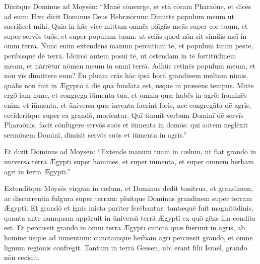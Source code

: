 Dīxitque Dominus ad Moysēn: ``Manē
cōnsurge, et stā cōram Pharaōne, et dīcēs ad eum:
Hæc dīcit Dominus Deus Hebræōrum: Dīmitte populum meum ut sacrificet
mihi.  Quia in hāc vice mittam omnēs 
plāgās meās super
cor tuum, et super servōs tuōs, et super populum tuum: ut sciās quod nōn
sit similis meī in omnī terrā.  Nunc enim extendēns manum percutiam tē,
et populum tuum peste, perībisque dē terrā.  Idcircō autem posuī tē, ut ostendam in tē fortitūdinem
meam, et nārrētur nōmen meum in omnī terrā.  Adhūc retinēs populum meum,
et nōn vīs dīmittere eum?  Ēn pluam crās hāc ipsā hōrā
grandinem multam nimis, quālis nōn fuit in Ægyptō ā diē quā
fundāta est, usque in præsēns tempus.  Mitte ergō iam nunc, et
congrega iūmenta tua, et omnia quæ habēs in agrō: hominēs
enim, et iūmenta, et ūniversa quæ inventa fuerint foris, nec
congregāta dē
agrīs, cecīderitque super ea grandō, morientur.  Quī
timuit verbum Dominī dē servīs Pharaōnis, facit cōnfugere
servōs suōs et iūmenta in domōs: quī autem neglēxit sermōnem Dominī,
dīmīsit servōs suōs et iūmenta in agrīs.''

Et dīxit Dominus ad Moysēn: ``Extende manum tuam in cælum, ut fīat grandō in ūniversā terrā Ægyptī super
hominēs, et super iūmenta, et super omnem herbam agrī in terrā Ægyptī.''

Extenditque Moysēs virgam in cælum, et Dominus dedit
tonitrua, et grandinem, ac discurrentia
fulgura super terram: pluitque Dominus grandinem super
terram Ægyptī.  Et grandō et ignis mista
pariter ferēbantur: tantæquē fuit
magnitūdinis, quanta ante numquam appāruit in ūniversā
terrā Ægyptī ex quō gēns illa condita est.  Et percussit
grandō in omnī terrā Ægyptī cūncta quæ fuērunt in agrīs, ab homine usque ad
iūmentum: cūnctamque herbam agrī percussit grandō, et omne lignum regiōnis
cōnfrēgit.  Tantum in terrā Gessen, ubi erant fīliī
Isrāēl, grandō nōn cecidit.  

